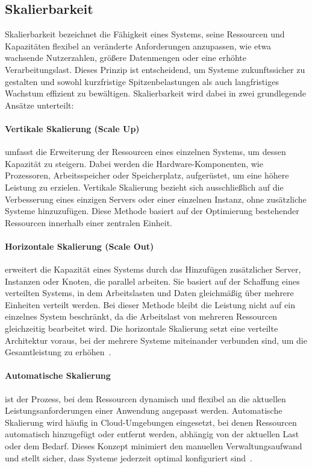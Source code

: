 

\subsection{Skalierbarkeit}

Skalierbarkeit bezeichnet die Fähigkeit eines Systems, seine Ressourcen und Kapazitäten flexibel an
veränderte Anforderungen anzupassen, wie etwa wachsende Nutzerzahlen, größere Datenmengen oder eine erhöhte Verarbeitungslast.
Dieses Prinzip ist entscheidend, um Systeme zukunftssicher zu gestalten und sowohl kurzfristige Spitzenbelastungen als auch
langfristiges Wachstum effizient zu bewältigen.
Skalierbarkeit wird dabei in zwei grundlegende Ansätze unterteilt:


\paragraph{Vertikale Skalierung (Scale Up)} umfasst die Erweiterung der Ressourcen eines einzelnen Systems, um dessen
Kapazität zu steigern.
Dabei werden die Hardware-Komponenten, wie Prozessoren, Arbeitsspeicher oder Speicherplatz, aufgerüstet,
um eine höhere Leistung zu erzielen.
Vertikale Skalierung bezieht sich ausschließlich auf die Verbesserung eines einzigen Servers oder einer
einzelnen Instanz, ohne zusätzliche Systeme hinzuzufügen.
Diese Methode basiert auf der Optimierung bestehender Ressourcen innerhalb einer zentralen Einheit.
\paragraph{Horizontale Skalierung (Scale Out)} erweitert die Kapazität eines Systems durch das Hinzufügen
zusätzlicher Server, Instanzen oder Knoten, die parallel arbeiten.
Sie basiert auf der Schaffung eines verteilten Systems, in dem Arbeitslasten und Daten gleichmäßig
über mehrere Einheiten verteilt werden.
Bei dieser Methode bleibt die Leistung nicht auf ein einzelnes System beschränkt, da die Arbeitslast von mehreren
Ressourcen gleichzeitig bearbeitet wird.
Die horizontale Skalierung setzt eine verteilte Architektur voraus, bei der mehrere Systeme miteinander verbunden sind,
um die Gesamtleistung zu erhöhen~\cite{ibm-scaling}.
\paragraph{Automatische Skalierung} ist der Prozess, bei dem Ressourcen dynamisch und flexibel an die aktuellen
Leistungsanforderungen einer Anwendung angepasst werden.
Automatische Skalierung wird häufig in Cloud-Umgebungen eingesetzt, bei denen Ressourcen automatisch hinzugefügt
oder entfernt werden, abhängig von der aktuellen Last oder dem Bedarf.
Dieses Konzept minimiert den manuellen Verwaltungsaufwand und stellt sicher, dass Systeme jederzeit optimal
konfiguriert sind~\cite{mic-autoscaling}.


